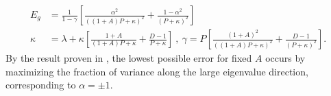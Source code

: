 \documentclass{article} %
\begin{document}
\begin{appendix}
\begin{equation}
\begin{aligned}
    E_g &= \frac{1}{1-\gamma} \left[ \frac{\alpha^2}{((1+A)P + \kappa)^2} + \frac{1-\alpha^2}{( P + \kappa )^2} \right] \nonumber
    \\
    \kappa &= \lambda + \kappa  \left[ \frac{1+A}{(1+A)P + \kappa} + \frac{D-1}{ P + \kappa} \right] \ ,  \ \gamma = P \left[ \frac{(1+A)^2}{((1+A)P + \kappa)^2} + \frac{D-1}{ (P + \kappa)^2} \right].
\end{aligned}
\end{equation}
By the result proven in \cite{Canatar2021SpectralBA}, the lowest possible error for fixed $A$ occurs by maximizing the fraction of variance along the large eigenvalue direction, corresponding to $\alpha = \pm 1$.






\end{appendix}
\end{document}

